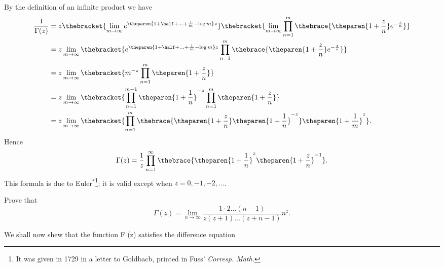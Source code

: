 By the definition of an infinite product we have
\begin{align*}
  \frac{1}{\Gamma(z)} 
  &= z 
    \thebracket{\lim_{m \rightarrow \infty} 
    e^{\theparen{1 + \half + \ldots + \frac{1}{m} - \log m}z}
    \vphantom{\prod_{n=1}^m}} %
    \thebracket{\lim_{m \rightarrow \infty}
    \prod_{n=1}^m
    \thebrace{\theparen{1 + \frac{z}{n}}  e^{-\frac{z}{n}}}} \\
  &=z \lim_{m \rightarrow \infty} \thebracket{
    e^{\theparen{1 + \half + \ldots + \frac{1}{m} - \log m}z}
    \prod_{n=1}^m
    \thebrace{\theparen{1 + \frac{z}{n}}  e^{-\frac{z}{n}}}} \\
  &= z \lim_{m \rightarrow \infty} \thebracket{
    m^{-z} \prod_{n=1}^m \theparen{1 + \frac{z}{n}}} \\
  &= z \lim_{m \rightarrow \infty} \thebracket{
    \prod_{n=1}^{m-1} \theparen{1 + \frac{1}{n}}^{-z}
    \prod_{n=1}^m \theparen{1 + \frac{z}{n}}} \\
  &= z \lim_{m \rightarrow \infty} \thebracket{
    \prod_{n=1}^{m} \thebrace{
    \theparen{1 + \frac{z}{n}}
    \theparen{1 + \frac{1}{n}}^{-z}
    } \theparen{1 + \frac{1}{m}}^z} .
\end{align*}
Hence 
\begin{displaymath}
  \Gamma(z) = \frac{1}{z} \prod_{n=1}^{\infty} \thebrace{
    \theparen{1 + \frac{1}{n}}^{z}
    \theparen{1 + \frac{z}{n}}^{-1} }.
\end{displaymath}
This formula is due to Euler$^*$\footnote{It was given 
in 1729 in a letter to Goldbacb, printed in Fuss'
\emph{Corresp. Math.}}; %
it is valid except when $z = 0, -1, -2, \ldots$. 

\begin{wandwexample*}
  Prove that
  \begin{displaymath}
    \Gamma(z) =
    \lim_{n \rightarrow \infty} 
    \frac{1 \cdot 2 \ldots %
      (n-1)}{z(z+1) \ldots(z+n-1)} n^z . 
  \end{displaymath}
\end{wandwexample*}


We shall now shew that the function F (z) satisfies the difference
equation

